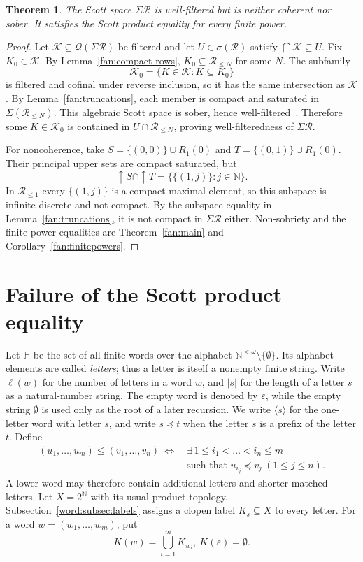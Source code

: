 \documentclass[10pt,a4paper]{article}
\newtheorem{theorem}{Theorem}[section]
\theoremstyle{definition}
\newcommand{\N}{\mathbb N}
\newcommand{\HH}{\mathbb H}
\newcommand{\RR}{\mathcal R}
\begin{document}
\begin{theorem}\label{fan:wellfiltered}
The Scott space $\Sigma\RR$ is well-filtered but is neither coherent nor sober. It satisfies the Scott product equality for every finite power.
\end{theorem}
\begin{proof}
Let $\mathcal K\subseteq\mathcal Q(\Sigma\RR)$ be filtered and let $U\in\sigma(\RR)$ satisfy $\bigcap\mathcal K\subseteq U$. Fix $K_0\in\mathcal K$. By Lemma~\ref{fan:compact-rows}, $K_0\subseteq\RR_{\leq N}$ for some $N$. The subfamily
\[
 \mathcal K_0=\{K\in\mathcal K:K\subseteq K_0\}
\]
is filtered and cofinal under reverse inclusion, so it has the same intersection as $\mathcal K$. By Lemma~\ref{fan:truncations}, each member is compact and saturated in $\Sigma(\RR_{\leq N})$. This algebraic Scott space is sober, hence well-filtered~\cite[Section~II-1]{GHK}. Therefore some $K\in\mathcal K_0$ is contained in $U\cap\RR_{\leq N}$, proving well-filteredness of $\Sigma\RR$.

For noncoherence, take $S=\{(0,0)\}\cup R_1(0)$ and $T=\{(0,1)\}\cup R_1(0)$. Their principal upper sets are compact saturated, but
\[
 {\uparrow} S\cap{\uparrow} T
 =\bigl\{\{(1,j)\}:j\in\N\bigr\}.
\]
In $\RR_{\leq1}$ every $\{(1,j)\}$ is a compact maximal element, so this subspace is infinite discrete and not compact. By the subspace equality in Lemma~\ref{fan:truncations}, it is not compact in $\Sigma\RR$ either. Non-sobriety and the finite-power equalities are Theorem~\ref{fan:main} and Corollary~\ref{fan:finitepowers}.
\end{proof}

\section{Failure of the Scott product equality}\label{sec:word}
Let $\HH$ be the set of all finite words over the alphabet
$\N^{<\omega}\setminus\{\emptyset\}$. Its alphabet elements are called \emph{letters}; thus a letter is itself a nonempty finite string. Write $\ell(w)$ for the number of letters in a word $w$, and $|s|$ for the length of a letter $s$ as a natural-number string. The empty word is denoted by $\varepsilon$, while the empty string $\emptyset$ is used only as the root of a later recursion. We write $\langle s\rangle$ for the one-letter word with letter $s$, and write $s\preceq t$ when the letter $s$ is a prefix of the letter $t$. Define
\begin{equation}\label{word:eq:order}
\begin{aligned}
(u_1,\ldots,u_m)\leq(v_1,\ldots,v_n)
~\Longleftrightarrow~
&\exists\,1\leq i_1<\ldots<i_n\leq m\\
&\text{such that }u_{i_j}\preceq v_j~(1\leq j\leq n).
\end{aligned}
\end{equation}
A lower word may therefore contain additional letters and shorter matched letters. Let $X=2^{\N}$ with its usual product topology. Subsection~\ref{word:subsec:labels} assigns a clopen label $K_s\subseteq X$ to every letter. For a word $w=(w_1,\ldots,w_m)$, put
\[
 K(w)=\bigcup_{i=1}^m K_{w_i},
 ~
 K(\varepsilon)=\emptyset.
\]
\end{document}
